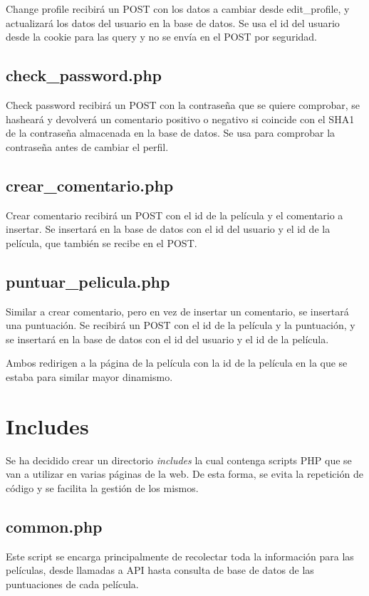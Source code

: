 \documentclass[a4paper, 12pt]{report}
\begin{document}
    Change profile recibirá un POST con los datos a cambiar desde edit\_profile, y actualizará los datos del usuario en la base de datos. Se usa el id del usuario desde la cookie para las query y no se envía en el POST por seguridad.

    \section{check\_password.php}

    Check password recibirá un POST con la contraseña que se quiere comprobar, se hasheará y devolverá un comentario positivo o negativo si coincide con el SHA1 de la contraseña almacenada en la base de datos. Se usa para comprobar la contraseña antes de cambiar el perfil.

    \section{crear\_comentario.php}

    Crear comentario recibirá un POST con el id de la película y el comentario a insertar. Se insertará en la base de datos con el id del usuario y el id de la película, que también se recibe en el POST.

    \section{puntuar\_pelicula.php}

    Similar a crear comentario, pero en vez de insertar un comentario, se insertará una puntuación. Se recibirá un POST con el id de la película y la puntuación, y se insertará en la base de datos con el id del usuario y el id de la película.

    Ambos redirigen a la página de la película con la id de la película en la que se estaba para similar mayor dinamismo.

    \chapter{Includes}
    Se ha decidido crear un directorio \textit{includes} la cual contenga scripts PHP que se van a utilizar en varias páginas de la web. De esta forma, se evita la repetición de código y se facilita la gestión de los mismos.
    \section{common.php}
    Este script se encarga principalmente de recolectar toda la información para las películas, desde llamadas a API hasta consulta de base de datos de las puntuaciones de cada película.
\end{document}

